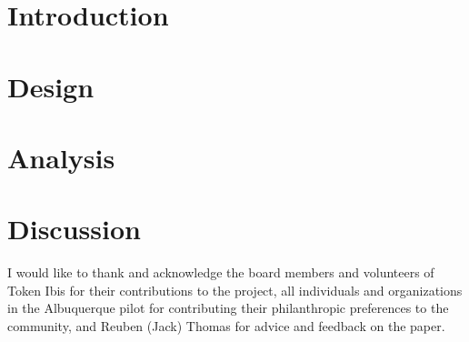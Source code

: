 \documentclass[sigconf]{acmart}
\begin{document}


\maketitle

\section{Introduction}


\section{Design}


\section{Analysis}


\section{Discussion}


\begin{acks}
  I would like to thank and acknowledge the board members and volunteers of Token Ibis for their contributions to the project, all individuals and organizations in the Albuquerque pilot for contributing their philanthropic preferences to the community, and Reuben (Jack) Thomas for advice and feedback on the paper.
\end{acks}


\balance

\end{document}
